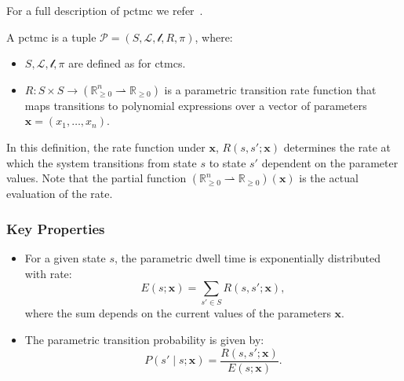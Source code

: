 For a full description of \gls{pctmc} we refer~\cite{bacci2023mm}.

\begin{definition}
    A \gls{pctmc} is a tuple $\mathcal{P} = (S, \mathcal{L}, \mathscr{l}, R, \pi)$, where:
    \begin{itemize}
        \item $S, \mathcal{L}, \mathscr{l}, \pi$ are defined as for \glspl{ctmc}.
        \item $R: S \times S \rightarrow (\mathbb{R}_{\geq 0}^n \rightharpoonup \mathbb{R}_{\geq 0})$ is a parametric transition rate function that maps transitions to polynomial expressions over a vector of parameters $\mathbf{x} = (x_1, \dots, x_n)$.
    \end{itemize}
\end{definition}


In this definition, the rate function under $\mathbf{x}$, $R(s, s'; \mathbf{x})$ determines the rate at which the system transitions from state $s$ to state $s'$ dependent on the parameter values.
Note that the partial function $(\mathbb{R}_{\geq 0}^n \rightharpoonup \mathbb{R}_{\geq 0})(\mathbf{x})$ is the actual evaluation of the rate.


\subsubsection{Key Properties}

\begin{itemize}
    \item For a given state $s$, the parametric dwell time is exponentially distributed with rate:
    \begin{equation}
        E(s; \mathbf{x}) = \sum_{s' \in S} R(s, s'; \mathbf{x}),\label{eq:exitrate-pctmc}
    \end{equation}
    where the sum depends on the current values of the parameters $\mathbf{x}$.
    \item The parametric transition probability is given by:
    \begin{equation}
        P(s' \mid s; \mathbf{x}) = \frac{R(s, s'; \mathbf{x})}{E(s; \mathbf{x})}.\label{eq:transition-probability-pctmc}
    \end{equation}
\end{itemize}


